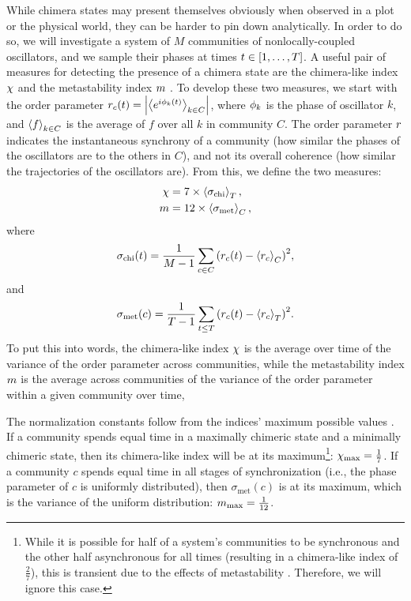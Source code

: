 While chimera states may present themselves obviously when observed in a plot or the physical world, they can be harder to pin down analytically.
In order to do so, we will investigate a system of $M$ communities of nonlocally-coupled oscillators, and we sample their phases at times $t \in \bqty{1, \ldots, T}$.
A useful pair of measures for detecting the presence of a chimera state are the chimera-like index $\chi$ and the metastability index $m$ \cite{Shanahan2010,Hizanidis2016}.
To develop these two measures, we start with the order parameter $r_{c}(t) = \abs{\expval{e^{i \phi_{k}(t)}}_{k \in C}}$, where $\phi_{k}$ is the phase of oscillator $k$, and $\ev{f}_{k \in C}$ is the average of $f$ over all $k$ in community $C$.
The order parameter $r$ indicates the instantaneous synchrony of a community (how similar the phases of the oscillators are to the others in $C$), and not its overall coherence (how similar the trajectories of the oscillators are).
From this, we define the two measures:
\begin{align}
  \label{eq:chimera}
  \chimera
  &=
    7 \times \expval{\sigma_{\text{chi}}}_{T}, \\
  \label{eq:metastability}
  \meta
  &=
    12 \times \expval{\sigma_{\text{met}}}_{C},
\end{align}
where
\begin{equation}
  \sigma_{\text{chi}}(t)
  =
  \frac{1}{M - 1} \sum_{c \in C}\pqty{\ordparam_{c}(t) - \expval{\ordparam_{c}}_{C}}^{2},
\end{equation}
and
\begin{equation}
  \sigma_{\text{met}}(c)
  =
  \frac{1}{T - 1} \sum_{t \leq T}\pqty{\ordparam_{c}(t) - \expval{\ordparam_{c}}_{T}}^{2}.
\end{equation}
To put this into words, the chimera-like index $\chi$ is the average over time of the variance of the order parameter across communities, while the metastability index $m$ is the average across communities of the variance of the order parameter within a given community over time,

The normalization constants follow from the indices' maximum possible values \cite{Shanahan2010}.
If a community spends equal time in a maximally chimeric state and a minimally chimeric state, then its chimera-like index will be at its maximum\footnote{While it is possible for half of a system's communities to be synchronous and the other half asynchronous for all times (resulting in a chimera-like index of $\frac{2}{7}$), this is transient due to the effects of metastability \cite{Shanahan2010}.  Therefore, we will ignore this case.}: $\chi_{\text{max}} = \frac{1}{7}$.
If a community $c$ spends equal time in all stages of synchronization (i.e., the phase parameter of $c$ is uniformly distributed), then $\sigma_{\text{met}}(c)$ is at its maximum, which is the variance of the uniform distribution: $m_{\text{max}} = \frac{1}{12}$.

